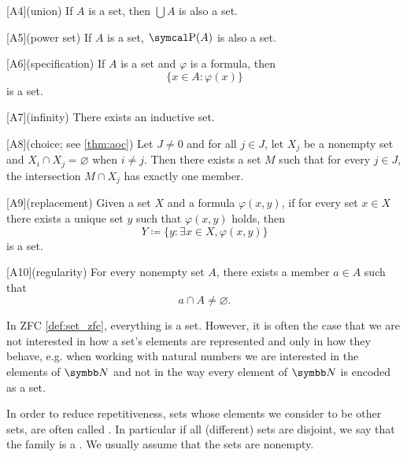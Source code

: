 \begin{definition}
\begin{description}
    [A4](union) If \( A \) is a set, then \( \bigcup A \) is also a set.

    [A5](power set) If \( A \) is a set, \( \Power(A) \) is also a set.

    [A6](specification) If \( A \) is a set and \( \varphi \) is a formula, then
    \begin{equation*}
      \{ x \in A \colon \varphi(x) \}
    \end{equation*}
    is a set.

    [A7](infinity) There exists an inductive set.

    [A8](choice; see \cref{thm:aoc}) Let \( J \neq 0 \) and for all \( j \in J \), let \( X_j \) be a nonempty set and \( X_i \cap X_j = \varnothing \) when \( i \neq j \). Then there exists a set \( M \) such that for every \( j \in J \), the intersection \( M \cap X_j \) has exactly one member.

    [A9](replacement) Given a set \( X \) and a formula \( \varphi(x, y) \), if for every set \( x \in X \) there exists a unique set \( y \) such that \( \varphi(x, y) \) holds, then
    \begin{equation*}
      Y \coloneqq \{ y \colon \exists x \in X, \varphi(x, y) \}
    \end{equation*}
    is a set.

    [A10](regularity) For every nonempty set \( A \), there exists a member \( a \in A \) such that
    \begin{equation*}
      a \cap A \neq \varnothing.
    \end{equation*}
  \end{description}
\end{definition}

\begin{remark}\label{remark:family_of_sets}
  In ZFC \cref{def:set_zfc}, everything is a set. However, it is often the case that we are not interested in how a set's elements are represented and only in how they behave, e.g. when working with natural numbers we are interested in the elements of \( \N \) and not in the way every element of \( \N \) is encoded as a set.

  In order to reduce repetitiveness, sets whose elements we consider to be other sets, are often called . In particular if all (different) sets are disjoint, we say that the family is a . We usually assume that the sets are nonempty.
\end{remark}

